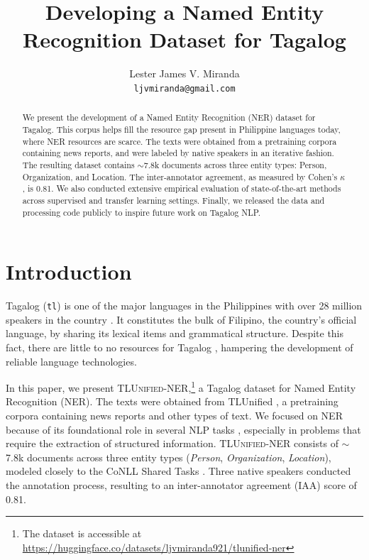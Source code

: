 \documentclass[11pt]{article}
\title{Developing a Named Entity Recognition Dataset for Tagalog}
\author{Lester James V. Miranda \\
  \texttt{ljvmiranda@gmail.com} \\}
\begin{document}
\newcommand{\tlunified}{\textsc{TLUnified-NER}}

\maketitle
\begin{abstract}
  We present the development of a Named Entity Recognition (NER) dataset for Tagalog.
  This corpus helps fill the resource gap present in Philippine languages today, where NER resources are scarce.
  The texts were obtained from a pretraining corpora containing news reports, and were labeled by native speakers in an iterative fashion.
  The resulting dataset contains $\sim$7.8k documents across three entity types: Person, Organization, and Location.
  The inter-annotator agreement, as measured by Cohen's $\kappa$, is 0.81.
  We also conducted extensive empirical evaluation of state-of-the-art methods across supervised and transfer learning settings.
  Finally, we released the data and processing code publicly to inspire future work on Tagalog NLP.
\end{abstract}

\section{Introduction}

Tagalog (\texttt{tl}) is one of the major languages in the Philippines with over 28 million speakers in the country \cite{Lewis2009EthnologueL}.
It constitutes the bulk of Filipino, the country's official language, by sharing its lexical items and grammatical structure.
Despite this fact, there are little to no resources for Tagalog \cite{Cruz2021ImprovingLL}, hampering the development of reliable language technologies.

In this paper, we present \tlunified{},\footnote[1]{The dataset is accessible at \url{https://huggingface.co/datasets/ljvmiranda921/tlunified-ner}} a Tagalog dataset for Named Entity Recognition (NER).
The texts were obtained from TLUnified \cite{Cruz2021ImprovingLL}, a pretraining corpora containing news reports and other types of text.
We focused on NER because of its foundational role in several NLP tasks \citep{Sang2003IntroductionTT,Lample2016NeuralAF}, especially in problems that require the extraction of structured information.
\tlunified{} consists of $\sim$7.8k documents across three entity types (\textit{Person}, \textit{Organization}, \textit{Location}), modeled closely to the CoNLL Shared Tasks \cite{Sang2002IntroductionTT,Sang2003IntroductionTT}.
Three native speakers conducted the annotation process, resulting to an inter-annotator agreement (IAA) score of 0.81.
\end{document}
